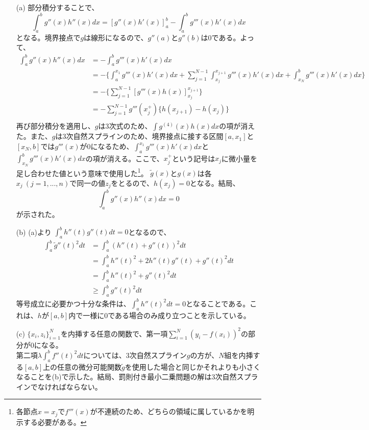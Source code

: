 \documentclass{jsarticle}
\begin{document}
\begin{enumerate}
\item[(a)]部分積分することで、
\[\int_{a}^{b}g''(x)h''(x)dx=[g''(x)h'(x)]_a^b-\int_{a}^{b}g'''(x)h'(x)dx\]
となる。境界接点で$g$は線形になるので、$g''(a)$と$g''(b)$は$0$である。よって、
\begin{align*}
\int_{a}^{b}g''(x)h''(x)dx&=-\int_{a}^{b}g'''(x)h'(x)dx\\
&=-\{\int_{a}^{x_1}g'''(x)h'(x)dx+\sum_{j=1}^{N-1}\int_{x_j}^{x_{j+1}}g'''(x)h'(x)dx+\int_{x_N}^{b}g'''(x)h'(x)dx\}\\
&=-\{\sum_{j=1}^{N-1}[g'''(x)h(x)]_{x_j}^{x_{j+1}}\}\\
&=-\sum_{j=1}^{N-1}g'''(x_j^{+})\{h(x_{j+1})-h(x_j)\}\\
\end{align*}
再び部分積分を適用し、$g$は3次式のため、$\int g^{(4)}(x)h(x)dx$の項が消えた。また、$g$は3次自然スプラインのため、境界接点に接する区間$[a,x_1]$と$[x_N,b]$では$g'''(x)$が$0$になるため、$\int_{a}^{x_1}g'''(x)h'(x)dx$と$\int_{x_N}^{b}g'''(x)h'(x)dx$の項が消える。ここで、$x_j^{+}$という記号は$x_j$に微小量を足し合わせた値という意味で使用した\footnote{各節点$x=x_j$で$f'''(x)$が不連続のため、どちらの領域に属しているかを明示する必要がある。}。
$\tilde{g}(x)$と$g(x)$は各$x_j\ (j=1,...,n)$で同一の値$z_j$をとるので、$h(x_j)=0$となる。結局、
\[\int_{a}^{b}g''(x)h''(x)dx=0\]
が示された。

\item[(b)]
(a)より $\int_a^b h''(t)g''(t)dt=0$となるので、
\begin{align*}
\int_a^b \tilde{g}''(t)^2dt&=\int_a^b (h''(t)+g''(t))^2dt\\
&=\int_a^b h''(t)^2+2h''(t)g''(t)+g''(t)^2dt\\
&=\int_a^b h''(t)^2+g''(t)^2dt\\
&\geq \int_a^b g''(t)^2dt
\end{align*}
等号成立に必要かつ十分な条件は、$\int_a^b h''(t)^2dt=0$となることである。これは、$h$が$[a,b]$内で一様に$0$である場合のみ成り立つことを示している。

\item[(c)]
$\{x_i, z_i\}_{i=1}^{N}$を内挿する任意の関数で、第一項$\sum_{i=1}^N (y_i-f(x_i))^2$の部分が$0$になる。\\
第二項$\lambda\int_a^b f''(t)^2dt$については、3次自然スプライン$g$の方が、$N$組を内挿する$[a,b]$上の任意の微分可能関数$\tilde{g}$を使用した場合と同じかそれよりも小さくなることを(b)で示した。結局、罰則付き最小二乗問題の解は3次自然スプラインでなければならない。
\end{enumerate}
\end{document}
